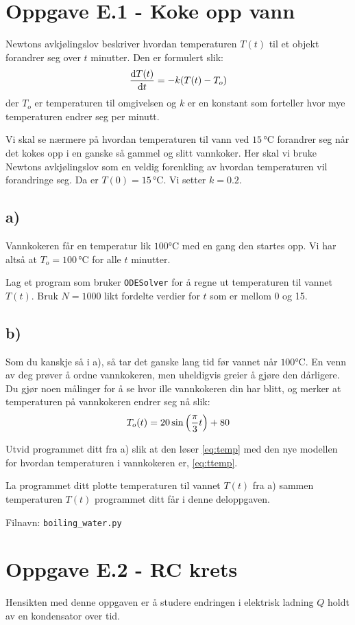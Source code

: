 \documentclass[10pt,a4paper]{article}
\begin{document}
\section*{Oppgave E.1 - Koke opp vann}
Newtons avkjølingslov beskriver hvordan temperaturen $T(t)$ til et objekt forandrer seg over $t$ minutter. 
Den er formulert slik:
\[
\dv{T(t)}{t} = -k\qty(T(t) - T_o) \label{eq:temp}
\]
der $T_o$ er temperaturen til omgivelsen og $k$ er en konstant som forteller hvor mye temperaturen endrer seg per minutt. 

Vi skal se nærmere på hvordan temperaturen til vann ved $15\,\si{\celsius}$ forandrer seg når det kokes opp i en ganske så gammel og slitt vannkoker. Her skal vi bruke Newtons avkjølingslov som en veldig forenkling av hvordan temperaturen vil forandringe seg.
Da er $T(0) = 15\,\si{\celsius}$. Vi setter $k = 0.2$. 

\subsection*{a)}
Vannkokeren får en temperatur lik $100 \si{\celsius}$ med en gang den startes opp. Vi har altså at $T_o= 100\,\si{\celsius}$ for alle $t$ minutter.  

Lag et program som bruker \texttt{ODESolver} for å regne ut temperaturen til vannet $T(t)$. Bruk $N = 1000$ likt fordelte verdier for $t$ som er mellom 0 og 15. 
\subsection*{b)}
Som du kanskje så i a), så tar det ganske lang tid før vannet når $100\si{\celsius}$. En venn av deg prøver å ordne vannkokeren, men uheldigvis greier å gjøre den dårligere. Du gjør noen målinger for å se hvor ille vannkokeren din har blitt, og merker at temperaturen på vannkokeren endrer seg nå slik:
\[
T_o(t) = 20\sin\qty(\frac{\pi}{3}t)+80  \label{eq:ttemp}
\]

Utvid programmet ditt fra a) slik at den løser \vref{eq:temp} med den nye modellen for hvordan temperaturen i vannkokeren er, \vref{eq:ttemp}. 

La programmet ditt plotte temperaturen til vannet $T(t)$ fra a) sammen temperaturen $T(t)$ programmet ditt får i denne deloppgaven. 

Filnavn: \texttt{boiling\_water.py}
\section*{Oppgave E.2 - RC krets}
Hensikten med denne oppgaven er å studere endringen i elektrisk ladning $Q$ holdt av en kondensator over tid.
	
\end{document}
